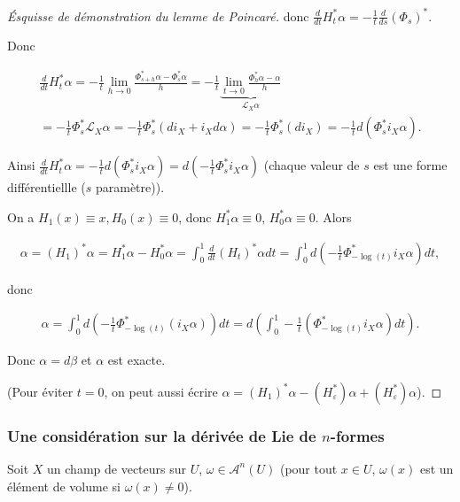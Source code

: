 \documentclass[french]{article}
\theoremstyle{definition}
\begin{document}
\begin{proof}[\'Esquisse de démonstration du lemme de Poincaré]
  donc \(\displaystyle\frac{d}{dt}H_t ^{*}\alpha = - \displaystyle\frac{1}{t}\displaystyle\frac{d}{ds}(\Phi_s)^{*}\).

  Donc

  \begin{gather*}
    \frac{d}{dt}H_t ^{*}\alpha = -\frac{1}{t}\lim_{h \to 0} \frac{\Phi _{s+h}^{*}\alpha - \Phi_s ^{*} \alpha}{h} = - \frac{1}{t}\underbrace{\lim_{t \to 0} \frac{\Phi_h ^{*}\alpha - \alpha}{h}}_{\mathcal{L}_X \alpha}\\
    = - \frac{1}{t}\Phi_s ^{*} \mathcal{L}_X \alpha = -\frac{1}{t}\Phi_s ^{*}(d i_X + i_X d \alpha) = - \frac{1}{t}\Phi_s ^{*}(di_X) = -\frac{1}{t}d(\Phi_s ^{*}i_X \alpha).
  \end{gather*}

  Ainsi \(\displaystyle \frac{d}{dt} H_t ^{*}\alpha = - \displaystyle \frac{1}{t}d(\Phi_s ^{*} i_X \alpha) = d \left(-\displaystyle \frac{1}{t} \Phi_s ^{*} i_X \alpha\right)\) (chaque valeur de \(s\) est une forme différentiellle (\(s\) paramètre)).

  On a \(H_1(x)\equiv x, H_0(x)\equiv 0\), donc \(H_1 ^{*}\alpha \equiv 0\), \(H_0 ^{*} \alpha \equiv 0\). Alors

  \begin{gather*}
    \alpha = (H_1)^{*} \alpha = H_1 ^{*} \alpha - H_0 ^{*} \alpha = \int_{0}^{1} \frac{d}{dt}(H_t)^{*} \alpha dt  = \int_{0}^{1} d \left(-\frac{1}{t} \Phi _{-\log(t)}^{*}i_X\alpha\right)dt,
  \end{gather*}

  donc

  \begin{gather*}
    \alpha = \int_{0}^{1} d \left(- \frac{1}{t}\Phi _{-\log(t)}^{*} (i_X \alpha)\right)dt = d \left(\int_{0}^{1} - \frac{1}{t} (\Phi _{-\log(t)}^{*}i_X \alpha) dt\right).
  \end{gather*}

  Donc \(\alpha = d \beta\) et \(\alpha\) est exacte.

  (Pour éviter \(t=0\), on peut aussi écrire \(\alpha = (H_1)^{*}\alpha - (H _{\varepsilon}^{*})\alpha + (H _{\varepsilon}^{*})\alpha\)).
\end{proof}

\subsubsection{Une considération sur la dérivée de Lie de \(n\)-formes}

Soit \(X\) un champ de vecteurs sur \(U\), \(\omega \in \mathscr{A}^{n}(U)\) (pour tout \(x \in U\), \(\omega(x)\) est un élément de volume si \(\omega(x)\neq 0\)).
\end{document}
